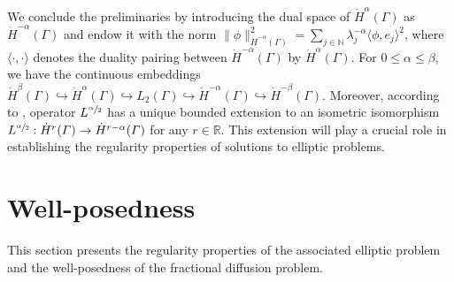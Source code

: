 \documentclass[numbers,webpdf]{ima-authoring-template}%
\theoremstyle{thmstyletwo}%
\numberwithin{equation}{section}
\begin{document}
We conclude the preliminaries by introducing the dual space of $\dot{H}^{\alpha}(\Gamma)$ as $\dot{H}^{-\alpha}(\Gamma)$ and endow it with the norm $\|\phi\|_{\dot{H}^{-\alpha}(\Gamma)}^2  = \sum_{j\in\mathbb{N}}\lambda_j^{-\alpha}\langle\phi, e_j\rangle^2$, where $\langle\cdot,\cdot\rangle$ denotes the duality pairing between $\dot{H}^{-\alpha}(\Gamma)$ by $\dot{H}^{\alpha}(\Gamma)$. For $0\leq \alpha\leq \beta$, we have the continuous embeddings $\dot{H}^{\beta}(\Gamma)\hookrightarrow\dot{H}^{\alpha}(\Gamma)\hookrightarrow L_2(\Gamma) \hookrightarrow \dot{H}^{-\alpha}(\Gamma)\hookrightarrow\dot{H}^{-\beta}(\Gamma)$. Moreover, according to \cite[Lemma~2.1]{bolin2020numerical}, operator $L^{\sfrac{\alpha}{2}}$ has a unique bounded extension to an isometric isomorphism $L^{\sfrac{\alpha}{2}}: \dot{H}^{r}({\mit\varGamma})\to \dot{H}^{r-\alpha}({\mit\varGamma})$ for any $r\in\mathbb{R}$. This extension will play a crucial role in establishing the regularity properties of solutions to elliptic problems.
\section{Well-posedness}
\label{sec:wellposedness}
This section presents the regularity properties of the associated elliptic problem and the well-posedness of the fractional diffusion problem.
\end{document}
